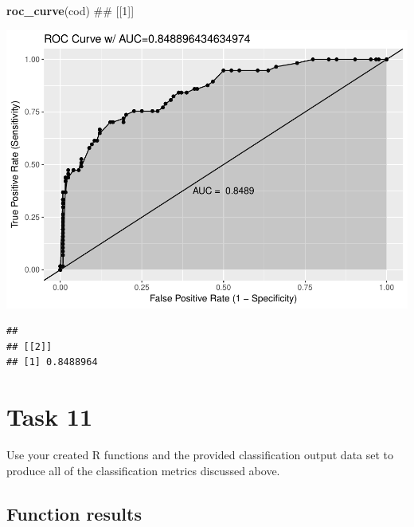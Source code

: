 \documentclass[]{article}
\newenvironment{Shaded}{\begin{snugshade}}{\end{snugshade}}
\newcommand{\KeywordTok}[1]{\textcolor[rgb]{0.13,0.29,0.53}{\textbf{#1}}}
\newcommand{\NormalTok}[1]{#1}
\begin{document}
\begin{Shaded}
\begin{Highlighting}[]
\KeywordTok{roc_curve}\NormalTok{(cod)}
\NormalTok{## [[1]]}
\end{Highlighting}
\end{Shaded}

\includegraphics{DATA_621_Homework_2_files/figure-latex/roc-output-1.pdf}

\begin{verbatim}
## 
## [[2]]
## [1] 0.8488964
\end{verbatim}

\section{Task 11}\label{task-11}

Use your created R functions and the provided classification output data
set to produce all of the classification metrics discussed above.

\subsection{Function results}\label{function-results}
\end{document}
